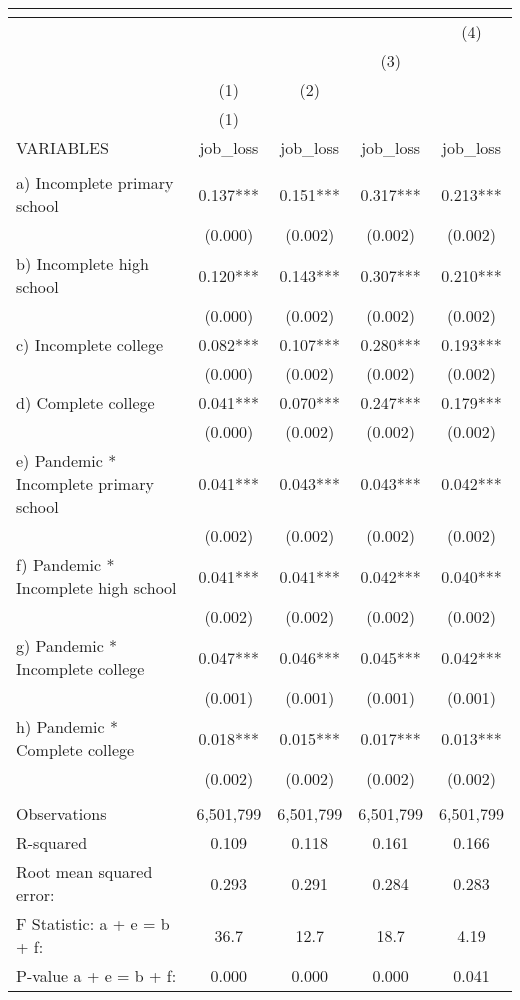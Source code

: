 \begin{tabular}{lcccc}
\multicolumn{5}{c}{} \\ \hline
 &  &  &  & (4) \\
 &  &  & (3) &  \\
 & (1) & (2) &  &  \\
 & (1) &  &  &  \\
VARIABLES & job\_loss & job\_loss & job\_loss & job\_loss \\ \hline
 &  &  &  &  \\
a) Incomplete primary school & 0.137*** & 0.151*** & 0.317*** & 0.213*** \\
 & (0.000) & (0.002) & (0.002) & (0.002) \\
b) Incomplete high school & 0.120*** & 0.143*** & 0.307*** & 0.210*** \\
 & (0.000) & (0.002) & (0.002) & (0.002) \\
c) Incomplete college & 0.082*** & 0.107*** & 0.280*** & 0.193*** \\
 & (0.000) & (0.002) & (0.002) & (0.002) \\
d) Complete college & 0.041*** & 0.070*** & 0.247*** & 0.179*** \\
 & (0.000) & (0.002) & (0.002) & (0.002) \\
e) Pandemic * Incomplete primary school & 0.041*** & 0.043*** & 0.043*** & 0.042*** \\
 & (0.002) & (0.002) & (0.002) & (0.002) \\
f) Pandemic * Incomplete high school & 0.041*** & 0.041*** & 0.042*** & 0.040*** \\
 & (0.002) & (0.002) & (0.002) & (0.002) \\
g) Pandemic * Incomplete college & 0.047*** & 0.046*** & 0.045*** & 0.042*** \\
 & (0.001) & (0.001) & (0.001) & (0.001) \\
h) Pandemic * Complete college & 0.018*** & 0.015*** & 0.017*** & 0.013*** \\
 & (0.002) & (0.002) & (0.002) & (0.002) \\
 &  &  &  &  \\
Observations & 6,501,799 & 6,501,799 & 6,501,799 & 6,501,799 \\
R-squared & 0.109 & 0.118 & 0.161 & 0.166 \\
Root mean squared error: & 0.293 & 0.291 & 0.284 & 0.283 \\
F Statistic: a + e = b + f: & 36.7 & 12.7 & 18.7 & 4.19 \\
\hspace{1mm} P-value a + e = b + f: & 0.000 & 0.000 & 0.000 & 0.041 \\

\end{tabular}
